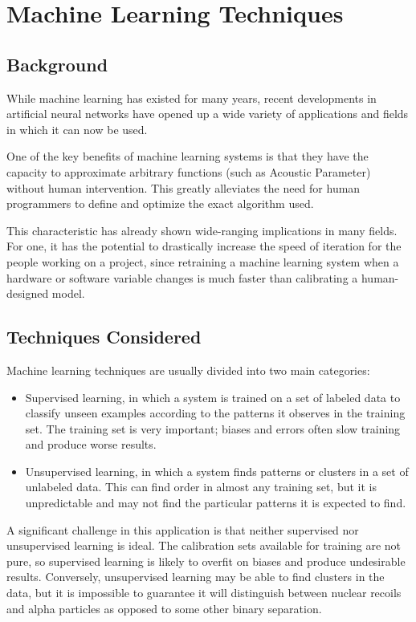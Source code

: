 \documentclass[10pt]{article}
\begin{document}
\section{Machine Learning Techniques}

\subsection{Background}

While machine learning has existed for many years, recent developments in artificial neural networks have opened up a wide variety of applications and fields in which it can now be used.

One of the key benefits of machine learning systems is that they have the capacity to approximate arbitrary functions (such as Acoustic Parameter) without human intervention. This greatly alleviates the need for human programmers to define and optimize the exact algorithm used.

This characteristic has already shown wide-ranging implications in many fields. For one, it has the potential to drastically increase the speed of iteration for the people working on a project, since retraining a machine learning system when a hardware or software variable changes is much faster than calibrating a human-designed model.

\subsection{Techniques Considered}

Machine learning techniques are usually divided into two main categories:

\begin{itemize}
    \item Supervised learning, in which a system is trained on a set of labeled data to classify unseen examples according to the patterns it observes in the training set. The training set is very important; biases and errors often slow training and produce worse results.
    \item Unsupervised learning, in which a system finds patterns or clusters in a set of unlabeled data. This can find order in almost any training set, but it is unpredictable and may not find the particular patterns it is expected to find.
\end{itemize}

A significant challenge in this application is that neither supervised nor unsupervised learning is ideal. The calibration sets available for training are not pure, so supervised learning is likely to overfit on biases and produce undesirable results. Conversely, unsupervised learning may be able to find clusters in the data, but it is impossible to guarantee it will distinguish between nuclear recoils and alpha particles as opposed to some other binary separation.
\end{document}
